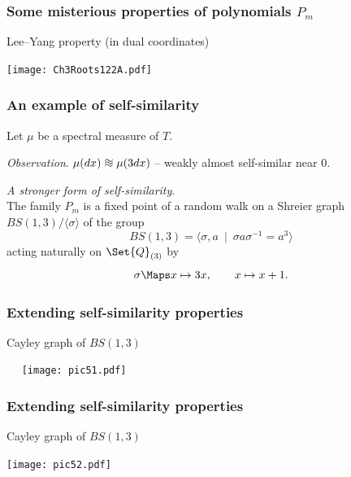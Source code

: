 \begin{frame}
  \frametitle{Some misterious properties of polynomials $P_m$}

  Lee--Yang property (in dual coordinates)
  
  \begin{center}
  \texttt{[image: Ch3Roots122A.pdf]}
  \end{center}
  
\end{frame}



\newcommand*{\threesim}{%
\mathrel{\vcenter{\offinterlineskip
\hbox{$\sim$}\vskip-.35ex\hbox{$\sim$}\vskip-.35ex\hbox{$\sim$}}}}

\begin{frame}
  \frametitle{An example of self-similarity}

  Let $\mu$ be a spectral measure of $T$.
  
  \bigskip
  {\it Observation}. $\mu(dx) \threesim \mu(3dx)$ -- weakly almost self-similar near $0$. %
  
  \pause
  \bigskip
  {\it A stronger form of self-similarity}. \\ 
  The family $P_m$ is a fixed point of a random walk on a Shreier graph $BS(1,3)/\langle \sigma \rangle$ of the group 
  $$
    BS(1,3) = \langle \sigma, a \: \mid \: \sigma a\sigma^{-1} = a^3 \rangle 
  $$
  acting naturally on $\Set{Q}_{(3)}$ by 
  $$
    \sigma \Maps x \mapsto 3x, \qquad x \mapsto x+1. 
  $$

\end{frame}


\begin{frame}
  \frametitle{Extending self-similarity properties}

  Cayley graph of $BS(1,3)$

  \begin{center}
  $\quad$ \texttt{[image: pic51.pdf]}
  \end{center}

\end{frame}


\begin{frame}
  \frametitle{Extending self-similarity properties}

  Cayley graph of $BS(1,3)$

  \begin{center}
  \texttt{[image: pic52.pdf]}
  \end{center}

\end{frame}


